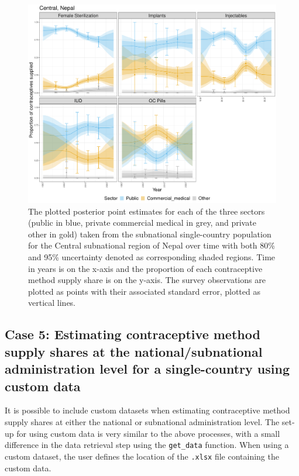 \begin{figure}[H]
\includegraphics[width=1\linewidth,height=0.4\textheight]{figures/fig_5} \caption{The plotted posterior point estimates for each of the three sectors (public in blue, private commercial medical in grey, and private other in gold) taken from the subnational single-country population for the Central subnational region of Nepal over time with both 80\% and 95\% uncertainty denoted as corresponding shaded regions. Time in years is on the x-axis and the proportion of each contraceptive method supply share is on the y-axis. The survey observations are plotted as points with their associated standard error, plotted as vertical lines.}\label{fig:fig-5}
\end{figure}

\subsection{Case 5: Estimating contraceptive method supply shares at the national/subnational administration level for a single-country using custom data}\label{case-5-estimating-contraceptive-method-supply-shares-at-the-nationalsubnational-administration-level-for-a-single-country-using-custom-data}

It is possible to include custom datasets when estimating contraceptive method supply shares at either the national or subnational administration level. The set-up for using custom data is very similar to the above processes, with a small difference in the data retrieval step using the \texttt{get\_data} function. When using a custom dataset, the user defines the location of the \texttt{.xlsx} file containing the custom data.

